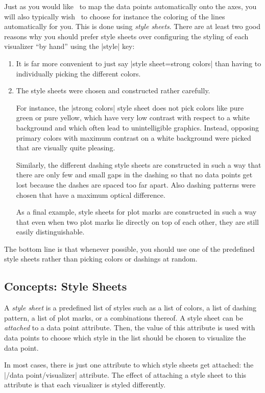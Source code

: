Just as you would like \tikzname\ to map the data points automatically
onto the axes, you will also typically wish \tikzname\ to choose for
instance the coloring of the lines automatically for you. This is done
using \emph{style sheets}. There are at least two good reasons why you
should prefer style sheets over configuring the styling of each
visualizer ``by hand'' using the |style| key:
\begin{enumerate}
\item It is far more convenient to just say
  |style sheet=strong colors| than having to individually
  picking the different colors.
\item The style sheets were chosen and constructed rather
  carefully.

  For instance, the |strong colors| style sheet does not
  pick colors like pure green or pure yellow, which have very low
  contrast with respect to a white background and which often lead to
  unintelligible graphics. Instead, opposing primary colors with
  maximum contrast on a white background were picked that are visually
  quite pleasing.

  Similarly, the different dashing style sheets are
  constructed in such a way that there are only few and small gaps in
  the dashing so that no data points get lost because the dashes are
  spaced too far apart. Also dashing patterns were chosen that have a
  maximum optical difference.

  As a final example, style sheets for
  plot marks are constructed in such a way that even when two plot
  marks lie directly on top of each other, they are still easily
  distinguishable. 
\end{enumerate}
The bottom line is that whenever possible, you should use one of the
predefined style sheets rather than picking colors or dashings at
random.

\subsection{Concepts: Style Sheets}

A \emph{style sheet} is a predefined list of styles such as a list of
colors, a list of dashing pattern, a list of plot marks, or a
combinations thereof. A style sheet can be \emph{attached} to a data
point attribute. Then, the value of this attribute is used with data
points to choose which style in the list should be chosen to visualize
the data point.

In most cases, there is just one attribute to which style sheets get
attached: the |/data point/visualizer| attribute. The effect of
attaching a style sheet to this attribute is that each visualizer is
styled differently.

